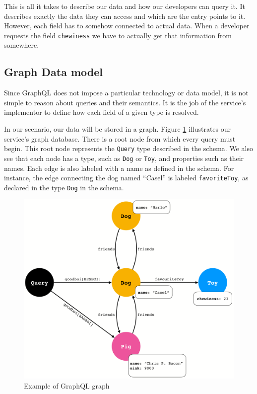 This is all it takes to describe our data and how our developers can query it. It describes exactly the data they can access and which are the entry points to it. However, each field has to somehow connected to actual data. When a developer requests the field \texttt{chewiness} we have to actually get that information from somewhere.

\subsection*{Graph Data model}
Since GraphQL does not impose a particular technology or data model, it is not simple to reason about queries and their semantics. It is the job of the service's implementor to define how  each field of a given type is resolved.

In our scenario, our data will be stored in a graph. Figure \ref{fig:graph_ex} illustrates our service's graph database. There is a root node from which every query must begin. This root node represents the \texttt{Query} type described in the schema. We also see that each node has a type, such as \texttt{Dog} or \texttt{Toy}, and properties such as their names. Each edge is also labeled with a name as defined in the schema. For instance, the edge connecting the dog named ``Casel'' is labeled \texttt{favoriteToy}, as declared in the type \texttt{Dog} in the schema.

\begin{figure}
    \centering
    \includegraphics[scale=0.23]{imgs/graph.png}
    \caption{Example of GraphQL graph }
    \label{fig:graph_ex}
\end{figure}

